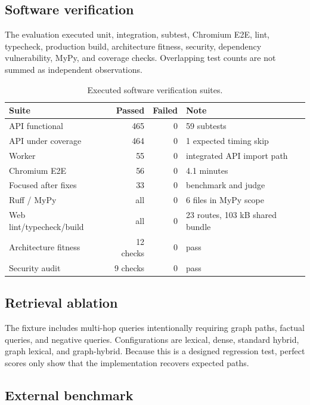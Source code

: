 \documentclass{sbc2023}
\begin{document}
\subsection{Software verification}

The evaluation executed unit, integration, subtest, Chromium E2E, lint, typecheck, production
build, architecture fitness, security, dependency vulnerability, MyPy, and coverage checks.
Overlapping test counts are not summed as independent observations.

\begin{table}[!t]
\caption{Executed software verification suites.}
\label{tab:tests}
\small
\begin{tabularx}{\textwidth}{Yrrp{2.5cm}}
\toprule
Suite & Passed & Failed & Note \\
\midrule
API functional & 465 & 0 & 59 subtests \\
API under coverage & 464 & 0 & 1 expected timing skip \\
Worker & 55 & 0 & integrated API import path \\
Chromium E2E & 56 & 0 & 4.1 minutes \\
Focused after fixes & 33 & 0 & benchmark and judge \\
Ruff / MyPy & all & 0 & 6 files in MyPy scope \\
Web lint/typecheck/build & all & 0 & 23 routes, 103 kB shared bundle \\
Architecture fitness & 12 checks & 0 & pass \\
Security audit & 9 checks & 0 & pass \\
\bottomrule
\end{tabularx}
\end{table}

\subsection{Retrieval ablation}

The fixture includes multi-hop queries intentionally requiring graph paths, factual queries, and
negative queries. Configurations are lexical, dense, standard hybrid, graph lexical, and
graph-hybrid. Because this is a designed regression test, perfect scores only show that the
implementation recovers expected paths.

\subsection{External benchmark}
\end{document}
